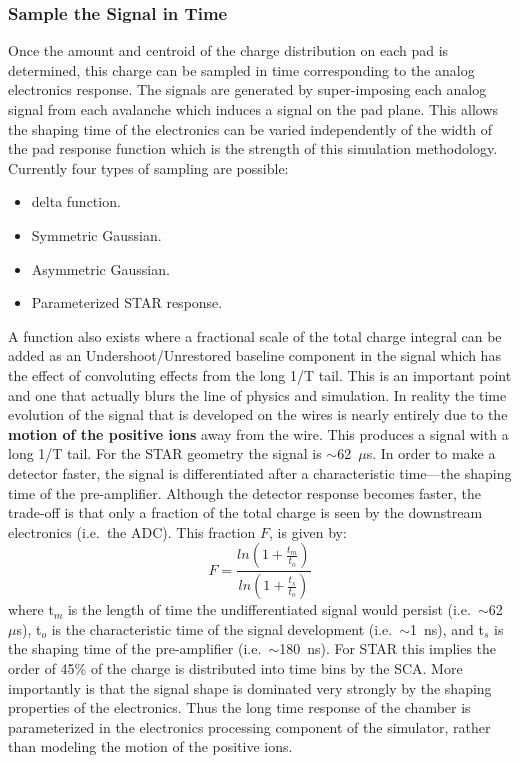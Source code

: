 \documentclass[twoside]{article}
\begin{document}
\subsubsection{Sample the Signal in Time}

Once the amount and centroid of the charge distribution
on each pad is determined, this charge can be sampled in
time corresponding to the analog electronics response.
The signals are generated by super-imposing each analog signal
from each avalanche which induces a signal on the pad plane.
This allows the shaping
time of the electronics can be varied independently of
the width of the pad response function which is the strength
of this simulation methodology.  Currently four types of
sampling are possible:
\begin{itemize}
  \item delta function.
  \item Symmetric Gaussian.
  \item Asymmetric Gaussian.
  \item Parameterized STAR response.
\end{itemize}
A function also exists where a fractional scale of the total charge integral
can be added as an Undershoot/Unrestored baseline component in the
signal which has the effect of convoluting effects from the long 1/T tail.
This is an important point and one that actually blurs the line of
physics and simulation.  In reality the
time evolution of the signal that is developed on the wires is nearly 
entirely due to the {\bf motion of the positive ions} away from the wire.
This produces a signal with a long 1/T tail.  For the STAR geometry
the signal is $\sim$62~$\mu$s.  In order to make a detector faster,
the signal is differentiated after a characteristic time---the
shaping time of the pre-amplifier.  Although the detector response
becomes faster, the trade-off is that only a fraction of the total
charge is seen by the downstream electronics (i.e.~the ADC).  This
fraction $F$, is given by:
\begin{equation}
  F = \frac{ln(1+\frac{t_{m}}{t_{o}})}{ln(1+\frac{t_{s}}{t_{o}})}
  \label{eq:fraction}
\end{equation}    
where t$_{m}$ is the length of time the undifferentiated signal would
persist (i.e.~$\sim$62~$\mu$s), t$_{o}$ is the characteristic time
of the signal development (i.e.~$\sim$1~ns), and t$_{s}$ is the shaping
time of the pre-amplifier (i.e.~$\sim$180~ns).  For STAR this implies
the order of 45\% of the charge is distributed into time bins by the
SCA.  More importantly is that the signal shape is dominated very strongly
by the shaping properties of the electronics.  Thus the
long time response of the chamber is parameterized in the electronics
processing component of the simulator, rather than modeling the
motion of the positive ions.
\end{document}

